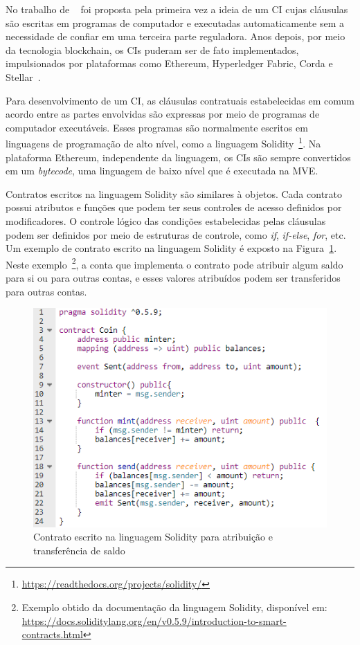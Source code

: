 No trabalho de ~ foi proposta pela primeira vez a ideia de um CI cujas cláusulas são escritas em programas de computador e executadas automaticamente sem a necessidade de confiar em uma terceira parte reguladora. Anos depois, por meio da tecnologia blockchain, os CIs puderam ser de fato implementados, impulsionados por plataformas como Ethereum, Hyperledger Fabric, Corda e Stellar~\cite{overview-smartcontracts2020zheng}.

Para desenvolvimento de um CI, as cláusulas contratuais estabelecidas em comum acordo entre as partes envolvidas são expressas por meio de programas de computador executáveis. Esses programas são normalmente escritos em linguagens de programação de alto nível, como a linguagem Solidity~\footnote{\url{https://readthedocs.org/projects/solidity/}}. Na plataforma Ethereum, independente da linguagem, os CIs são sempre convertidos em um \textit{bytecode}, uma linguagem de baixo nível que é executada na MVE.

Contratos escritos na linguagem Solidity são similares à objetos. Cada contrato possui atributos e funções que podem ter seus controles de acesso definidos por modificadores. O controle lógico das condições estabelecidas pelas cláusulas podem ser definidos por meio de estruturas de controle, como \textit{if}, \textit{if-else}, \textit{for}, etc. Um exemplo de contrato escrito na linguagem Solidity é exposto na Figura~\ref{fig:exemplo-contrato-solidity}. Neste exemplo~\footnote{Exemplo obtido da documentação da linguagem Solidity, disponível em: \url{https://docs.soliditylang.org/en/v0.5.9/introduction-to-smart-contracts.html}}, a conta que implementa o contrato pode atribuir algum saldo para si ou para outras contas, e esses valores atribuídos podem ser transferidos para outras contas.

\begin{figure}[htb]
 \caption{Contrato escrito na linguagem Solidity para atribuição e transferência de saldo}
 \label{fig:exemplo-contrato-solidity}
 \centering
 \includegraphics[scale=0.7]{figuras/exemplo_codigo_solidity.png}
\end{figure}

